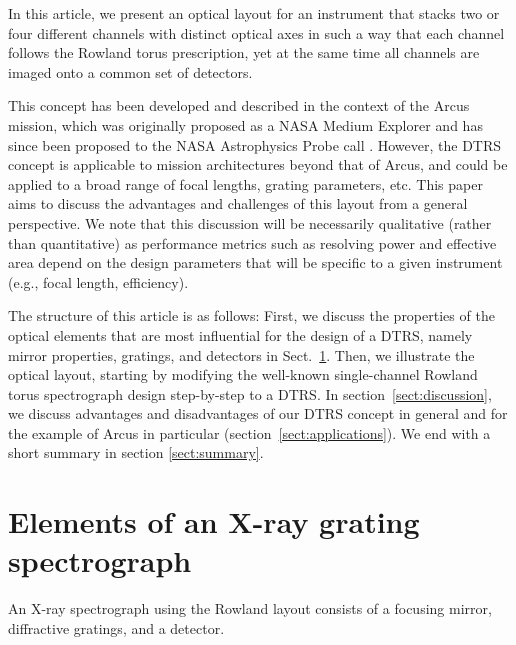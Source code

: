 \documentclass[linenumbers]{aastex631}
\begin{document}
In this article, we present an optical layout for an instrument that stacks two or four different channels with distinct optical axes in such a way that each channel follows the Rowland torus prescription, yet at the same time all channels are imaged onto a common set of detectors.


This concept has been developed and described in the context of the Arcus mission, which was originally proposed as a NASA Medium Explorer \citep{2019SPIE11118E..0WS} and  has since been proposed to the NASA Astrophysics Probe call \citep{2023SPIE12678E..0ES}. However, the DTRS concept is applicable to mission architectures beyond that of Arcus, and could be applied to a broad range of focal lengths, grating parameters, etc. This paper aims to discuss the advantages and challenges of this layout from a general perspective. We note that this discussion will be necessarily qualitative (rather than quantitative) as performance metrics such as resolving power and effective area depend on the design parameters that will be specific to a given instrument (e.g., focal length, efficiency).

The structure of this article is as follows: First, we discuss the properties of the optical elements that are most influential for the design of a DTRS, namely mirror properties, gratings, and detectors in Sect.~\ref{sect:elements}. Then, we illustrate the optical layout, starting by modifying the well-known single-channel Rowland torus spectrograph design step-by-step to a DTRS. In section~\ref{sect:discussion}, we discuss advantages and disadvantages of our DTRS concept in general and for the example of Arcus in particular (section~\ref{sect:applications}). We end with a short summary in section \ref{sect:summary}.

\section{Elements of an X-ray grating spectrograph}
\label{sect:elements}
An X-ray spectrograph using the Rowland layout consists of a focusing mirror, diffractive gratings, and a detector.
\end{document}
